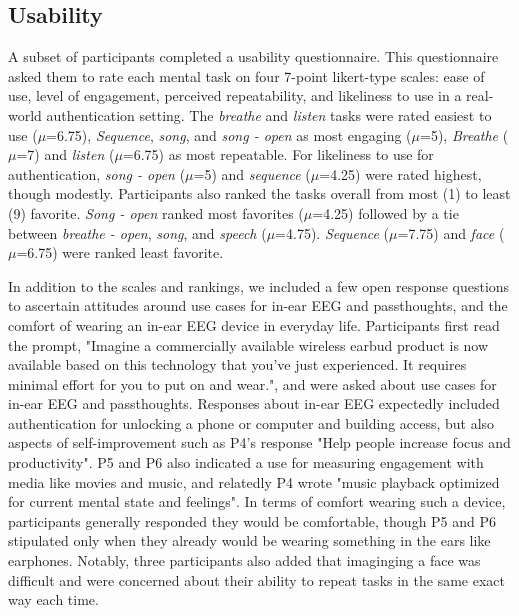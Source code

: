 \documentclass{sigchi}
\begin{document}
\subsection{Usability}

A subset of participants completed a usability questionnaire. This questionnaire asked them to rate each mental task on four 7-point likert-type scales: ease of use, level of engagement, perceived repeatability, and likeliness to use in a real-world authentication setting. The \textit{breathe} and \textit{listen} tasks were rated easiest to use (\(\mu\)=6.75), \textit{Sequence}, \textit{song}, and \textit{song - open} as most engaging (\(\mu\)=5), \textit{Breathe} (\(\mu\)=7) and \textit{listen} (\(\mu\)=6.75) as most repeatable. For likeliness to use for authentication, \textit{song - open} (\(\mu\)=5) and \textit{sequence} (\(\mu\)=4.25) were rated highest, though modestly. Participants also ranked the tasks overall from most (1) to least (9) favorite. \textit{Song - open} ranked most favorites (\(\mu\)=4.25) followed by a tie between \textit{breathe - open}, \textit{song}, and \textit{speech} (\(\mu\)=4.75). \textit{Sequence} (\(\mu\)=7.75) and \textit{face} (\(\mu\)=6.75) were ranked least favorite.

In addition to the scales and rankings, we included a few open response questions to ascertain attitudes around use cases for in-ear EEG and passthoughts, and the comfort of wearing an in-ear EEG device in everyday life. Participants first read the prompt, "Imagine a commercially available wireless earbud product is now available based on this technology that you've just experienced. It requires minimal effort for you to put on and wear.", and were asked about use cases for in-ear EEG and passthoughts. Responses about in-ear EEG expectedly included authentication for unlocking a phone or computer and building access, but also aspects of self-improvement such as P4's response "Help people increase focus and productivity". P5 and P6 also indicated a use for measuring engagement with media like movies and music, and relatedly P4 wrote "music playback optimized for current mental state and feelings". In terms of comfort wearing such a device, participants generally responded they would be comfortable, though P5 and P6 stipulated only when they already would be wearing something in the ears like earphones. Notably, three participants also added that imaginging a face was difficult and were concerned about their ability to repeat tasks in the same exact way each time.
\end{document}
